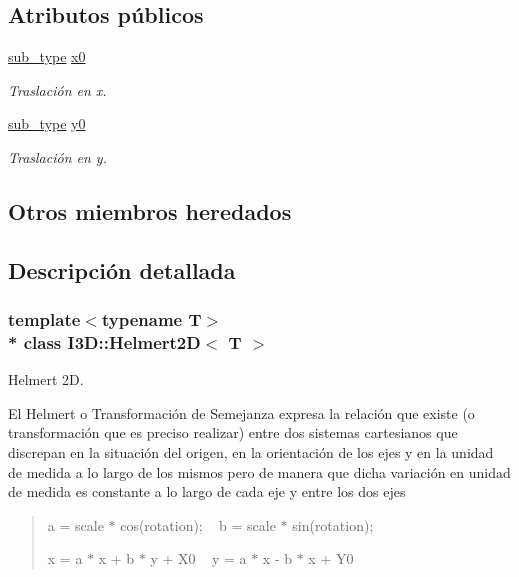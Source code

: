 \subsection*{Atributos públicos}
\begin{DoxyCompactItemize}
\item 
\hyperlink{class_i3_d_1_1_transform_ac087b4b8b9acb1b11a6caa2231d598c7}{sub\+\_\+type} \hyperlink{class_i3_d_1_1_helmert2_d_ad0bb6ad335ff383cf85f29a3da60c2e7}{x0}
\begin{DoxyCompactList}\small\item\em Traslación en x. \end{DoxyCompactList}\item 
\hyperlink{class_i3_d_1_1_transform_ac087b4b8b9acb1b11a6caa2231d598c7}{sub\+\_\+type} \hyperlink{class_i3_d_1_1_helmert2_d_a60ddf8a70434410bc53e610abf583dbe}{y0}
\begin{DoxyCompactList}\small\item\em Traslación en y. \end{DoxyCompactList}\end{DoxyCompactItemize}
\subsection*{Otros miembros heredados}


\subsection{Descripción detallada}
\subsubsection*{template$<$typename T$>$\\*
class I3\+D\+::\+Helmert2\+D$<$ T $>$}

Helmert 2D. 

El Helmert o Transformación de Semejanza expresa la relación que existe (o transformación que es preciso realizar) entre dos sistemas cartesianos que discrepan en la situación del origen, en la orientación de los ejes y en la unidad de medida a lo largo de los mismos pero de manera que dicha variación en unidad de medida es constante a lo largo de cada eje y entre los dos ejes

\begin{quote}
a = scale $\ast$ cos(rotation); ~\newline
 b = scale $\ast$ sin(rotation);

x\textquotesingle{} = a $\ast$ x + b $\ast$ y + X0 ~\newline
 y\textquotesingle{} = a $\ast$ x -\/ b $\ast$ x + Y0 \end{quote}


